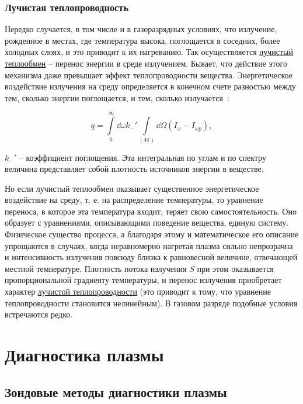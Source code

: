 \documentclass[10pt, a4paper]{article}
\let\stdsection\section
\renewcommand\section{\newpage\stdsection}
\begin{document}
\subsubsection{Лучистая теплопроводность}

Нередко случается, в том числе и в газоразрядных условиях, что излучение, рожденное в местах, где температура высока, поглощается в соседних, более холодных слоях, и это приводит к их нагреванию. Так осуществляется \uline{лучистый теплообмен} -- перенос энергии в среде излучением. Бывает, что действие этого механизма даже превышает эффект теплопроводности вещества. Энергетическое воздействие излучения на среду определяется в конечном счете разностью между тем, сколько энергии поглощается, и тем, сколько излучается~\cite{raizer}:

\begin{equation*}
	q = \int\limits_0^\infty\dd{\omega}k_{-}'\int\limits_{(4\pi)}\dd{\Omega}(I_\omega-I_{\omega p}),
\end{equation*}

$k_{-}'$ -- коэффициент поглощения. Эта интегральная по углам и по спектру величина представляет собой плотность источников энергии в веществе.

Но если лучистый теплообмен оказывает существенное энергетическое воздействие на среду, т. е. на распределение температуры, то уравнение переноса, в которое эта температура входит, теряет свою самостоятельность. Оно образует с уравнениями, описывающими поведение вещества, единую систему. Физическое существо процесса, а благодаря этому и математическое его описание упрощаются в случаях, когда неравномерно нагретая плазма сильно непрозрачна и интенсивность излучения повсюду близка к равновесной величине, отвечающей местной температуре. Плотность потока излучения $S$ при этом оказывается пропорциональной градиенту температуры, и перенос излучения приобретает характер \uline{лучистой теплопроводности} (это приводит к тому, что уравнение теплопроводности становится нелинейным). В газовом разряде подобные условия встречаются редко. 

\section{Диагностика плазмы} 

\subsection{Зондовые методы диагностики плазмы} \label{subsec:Langmuir_probe}
\end{document}
